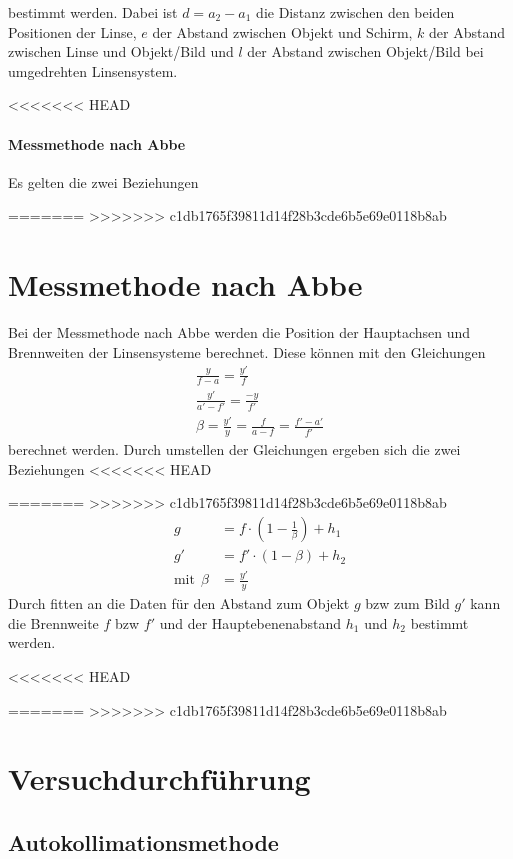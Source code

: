 \documentclass[11pt, a4paper]{article}
\begin{document}
    bestimmt werden. Dabei ist $d = a_2 - a_1$ die Distanz zwischen den beiden Positionen der Linse, $e$ der Abstand zwischen Objekt und Schirm, $k$ der Abstand zwischen Linse und Objekt/Bild und $l$ der Abstand zwischen Objekt/Bild bei umgedrehten Linsensystem.

<<<<<<< HEAD
    \paragraph{Messmethode nach Abbe}
    Es gelten die zwei Beziehungen

=======
>>>>>>> c1db1765f39811d14f28b3cde6b5e69e0118b8ab
    \section{Messmethode nach Abbe}
    Bei der Messmethode nach Abbe werden die Position der Hauptachsen und Brennweiten der Linsensysteme berechnet. Diese können mit den Gleichungen
    \begin{align}
        \frac{y}{f-a} = \frac{y'}{f} \\
        \frac{y'}{a'-f'} = \frac{-y}{f'} \\
        \beta = \frac{y'}{y} = \frac{f}{a-f} = \frac{f'-a'}{f'}
    \end{align}
    berechnet werden. Durch umstellen der Gleichungen ergeben sich die zwei Beziehungen
<<<<<<< HEAD

=======
>>>>>>> c1db1765f39811d14f28b3cde6b5e69e0118b8ab
    \begin{align}
        g &= f \cdot \left(1 - \frac{1}{\beta}\right) + h_1 \label{eq:dicke1} \\
        g' &= f' \cdot (1 - \beta) + h_2 \label{eq:dicke2} \\
        \text{mit} \ \ \beta &= \frac{y'}{y}
    \end{align}
    Durch fitten an die Daten für den Abstand zum Objekt $g$ bzw zum Bild $g'$ kann die Brennweite $f$ bzw $f'$ und der Hauptebenenabstand $h_1$ und $h_2$ bestimmt werden.

<<<<<<< HEAD

=======
>>>>>>> c1db1765f39811d14f28b3cde6b5e69e0118b8ab
    \section{Versuchdurchführung}

    \subsection{Autokollimationsmethode} %
\end{document}
